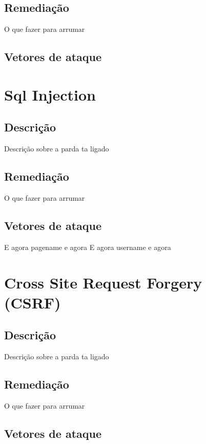 \documentclass{ufscThesis}
\newcommand{\+}{\discretionary{\mbox{${\bm\cdot}\mkern-1mu$}}{}{}}
\renewcommand\+{\discretionary{}{}{}}
\begin{document}
\subsection{Remediação}

O que fazer para arrumar

\subsection{Vetores de ataque}

\section{Sql Injection}

\subsection{Descrição}

Descrição sobre a parda ta ligado

\subsection{Remediação}

O que fazer para arrumar

\subsection{Vetores de ataque}

E agora pagename
e agora
E agora username
e agora
\section{Cross Site Request Forgery (CSRF)}

\subsection{Descrição}

Descrição sobre a parda ta ligado

\subsection{Remediação}

O que fazer para arrumar

\subsection{Vetores de ataque}
\end{document}
